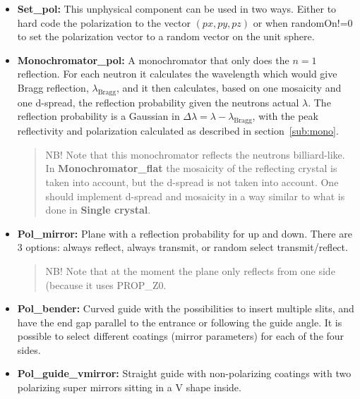 \begin{itemize}
\item \textbf{Set\_pol:} This unphysical component can be used in two
ways. Either to hard code the polarization to the vector $(px, py, pz)$
or when randomOn!=0 to set the polarization vector to a random vector
on the unit sphere.\\

\item \textbf{Monochromator\_pol:} A monochromator that only does the $n=1$
  reflection. For each neutron it calculates the wavelength which would give
  Bragg reflection, $\lambda_\text{Bragg}$, and it then calculates, based on
  one mosaicity and one d-spread, the reflection probability given the neutrons
  actual $\lambda$.  The reflection probability is a Gaussian in $\Delta
  \lambda = \lambda - \lambda_\text{Bragg}$, with the peak reflectivity and
  polarization calculated as described in section~\ref{sub:mono}.

  \begin{quote}
    NB! Note that this monochromator reflects the neutrons billiard-like. In
    \textbf{Monochromator\_flat} the mosaicity of the reflecting crystal is
    taken into account, but the d-spread is not taken into account. One should
    implement d-spread and mosaicity in a way similar to what is done in
    \textbf{Single crystal}.
  \end{quote}

\item \textbf{Pol\_mirror:} Plane with a reflection probability for up
and down. There are 3 options: always reflect, always transmit, or
random select transmit/reflect.

\begin{quote}
  NB! Note that at the moment the plane only reflects from one side (because
  it uses PROP\_Z0.
\end{quote}

\item \textbf{Pol\_bender:} Curved guide with the possibilities to
  insert multiple slits, and have the end gap parallel to the entrance
  or following the guide angle. It is possible to select different
  coatings (mirror parameters) for each of the four sides.\\

\item \textbf{Pol\_guide\_vmirror:} Straight guide with non-polarizing
  coatings with two polarizing super mirrors sitting in a V shape
  inside. \\
\end{itemize}

